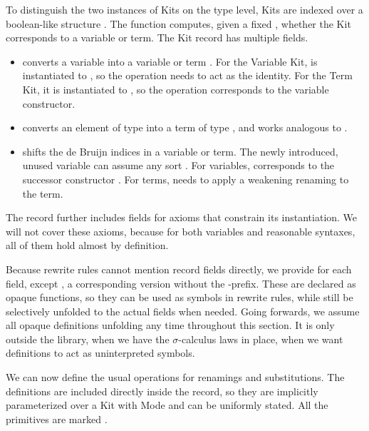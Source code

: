 \documentclass[screen,nonacm]{acmart}
\begin{document}
\noindent To distinguish the two instances of Kits on the type level, Kits are indexed over
a boolean-like structure . The  function computes,
given a fixed , whether the Kit corresponds to a variable or
term. The Kit record has multiple fields.
\begin{itemize}
      \item {} converts a variable into a variable or term   .
            For the Variable Kit,  is instantiated to , so the operation needs to act as the identity.
            For the Term Kit, it is instantiated to , so the operation corresponds to the variable constructor.
      \item {} converts an element of type    into a term of type   , and works analogous to .
      \item {} shifts the de Bruijn indices in a variable or term.
            The newly introduced, unused variable  can assume any sort .
            For variables,  corresponds to the successor constructor .
            For terms,  needs to apply a weakening renaming to the term.
\end{itemize}

\noindent The  record further includes fields for axioms that constrain
its instantiation. We will not cover these axioms, because for both variables
and reasonable syntaxes, all of them hold almost by definition.

Because rewrite rules cannot mention record fields directly, we provide for
each field, except , a corresponding version without the
-prefix. These are declared as opaque functions, so they can be
used as symbols in rewrite rules, while still be selectively unfolded to the
actual fields when needed. Going forwards, we assume all opaque definitions
unfolding any time throughout this section. It is only outside the library,
when we have the $σ$-calculus laws in place, when we want definitions to act as
uninterpreted symbols.

We can now define the usual operations for renamings and substitutions. The
definitions are included directly inside the  record, so they
are implicitly parameterized over a Kit  with Mode 
and can be uniformly stated. All the primitives are marked
.
\end{document}
